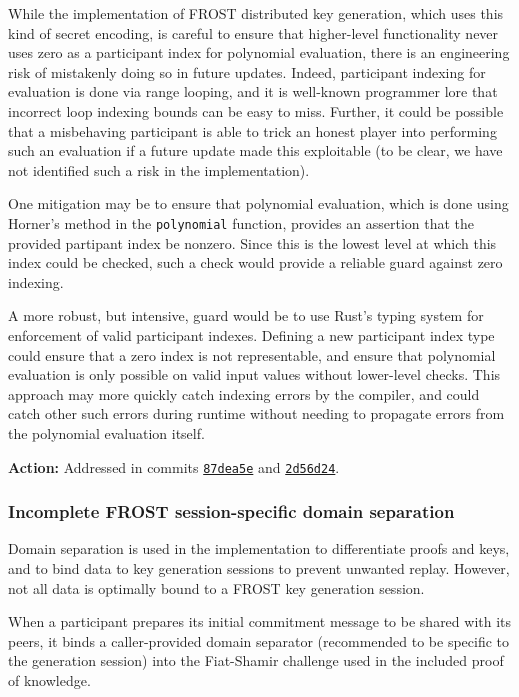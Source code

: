 \documentclass{article}
\begin{document}
While the implementation of FROST distributed key generation, which uses this kind of secret encoding, is careful to ensure that higher-level functionality never uses zero as a participant index for polynomial evaluation, there is an engineering risk of mistakenly doing so in future updates.
Indeed, participant indexing for evaluation is done via range looping, and it is well-known programmer lore that incorrect loop indexing bounds can be easy to miss.
Further, it could be possible that a misbehaving participant is able to trick an honest player into performing such an evaluation if a future update made this exploitable (to be clear, we have not identified such a risk in the implementation).

One mitigation may be to ensure that polynomial evaluation, which is done using Horner's method in the \texttt{polynomial} function, provides an assertion that the provided partipant index be nonzero.
Since this is the lowest level at which this index could be checked, such a check would provide a reliable guard against zero indexing.

A more robust, but intensive, guard would be to use Rust's typing system for enforcement of valid participant indexes.
Defining a new participant index type could ensure that a zero index is not representable, and ensure that polynomial evaluation is only possible on valid input values without lower-level checks.
This approach may more quickly catch indexing errors by the compiler, and could catch other such errors during runtime without needing to propagate errors from the polynomial evaluation itself.

\textbf{Action:} Addressed in commits \href{https://github.com/serai-dex/serai/commit/87dea5e455fa20ee0a0ffb97af3d8c0bdb938d79}{\texttt{87dea5e}} and \href{https://github.com/serai-dex/serai/commit/2d56d24d9c1d4637700f8d6038d5ac6a2e7329b7}{\texttt{2d56d24}}.


\subsubsection{Incomplete FROST session-specific domain separation}

Domain separation is used in the implementation to differentiate proofs and keys, and to bind data to key generation sessions to prevent unwanted replay.
However, not all data is optimally bound to a FROST key generation session.

When a participant prepares its initial commitment message to be shared with its peers, it binds a caller-provided domain separator (recommended to be specific to the generation session) into the Fiat-Shamir challenge used in the included proof of knowledge.
\end{document}
